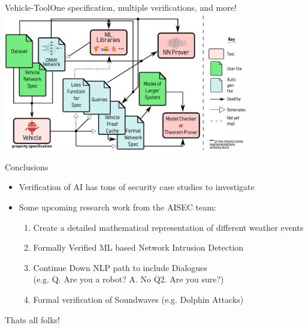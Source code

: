 \documentclass[t,compress,aspectratio=169]{beamer}
\begin{document}



\begin{frame}{Vehicle-Tool}{One specification, multiple verifications, and more!}
\centering\vspace{-0.5cm}\includegraphics[width=0.8\textwidth]{img/vehicle-overview.pdf}
\end{frame}



%
\begin{frame}{Conclusions}
	\begin{itemize}
		\item Verification of AI has  tons of security case studies to investigate
        \item Some upcoming research work from the AISEC team:
        \begin{enumerate}
            \item  Create a detailed mathematical representation of different weather events
            \item Formally Verified ML based Network Intrusion Detection
            \item Continue Down NLP path to include Dialogues\\ (e.g. Q. Are you a robot? A. No Q2. Are you sure?)
            \item Formal verification of Soundwaves (e.g. Dolphin Attacks)
        \end{enumerate}

	\end{itemize}

\vspace{1em}
\Large \centering Thats all folks!

\end{frame}
\end{document}
